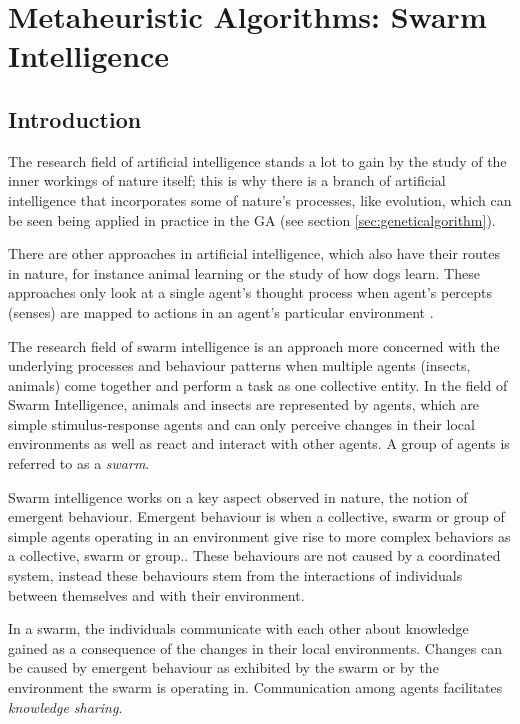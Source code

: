 \chapter[Swarm Intelligence]{Metaheuristic Algorithms: Swarm Intelligence}
\label{chpt:swarm}
\section{Introduction}
The research field of artificial intelligence stands a lot to gain by the study of the inner workings of nature itself; this is why there is a branch of artificial intelligence that incorporates some of nature's processes, like evolution, which can be seen being applied in practice in the \gls{GA} (see section \ref{sec:geneticalgorithm}).

 There are other approaches in artificial intelligence, which also have their routes in nature, for instance animal learning or the study of how dogs learn\cite{DLearning}. These approaches only look at a single agent's thought process when agent's percepts (senses) are mapped to actions in an agent's particular environment \cite{DLearning}. 
 

The research field of swarm intelligence is an approach more concerned with the underlying processes and behaviour patterns when multiple agents (insects, animals) come together and perform a task as one collective entity\cite{DLearning,AIModernApproach}. In the field of Swarm Intelligence, animals and insects are represented by agents, which are simple stimulus-response agents and can only perceive changes in their local environments as well as react and interact with other agents. A group of agents is referred to as a \emph{swarm}.

Swarm intelligence works on a key aspect observed in nature, the notion of emergent behaviour\cite{SwarmArt,FundamentalSwarm}. Emergent behaviour is when a collective, swarm or group of simple agents operating in an environment give rise to more complex behaviors as a collective, swarm or group.\cite{SwarmArt,FundamentalSwarm}. These behaviours are not caused by a coordinated system, instead these behaviours stem from the interactions of individuals between themselves and with their environment\cite{FundamentalSwarm}.

In a swarm, the individuals communicate with each other about knowledge gained as a consequence of the changes in their local environments\cite{SwarmArt,ChaoticSwarmIntel}. Changes can be caused by emergent behaviour as exhibited by the swarm or by the environment the swarm is operating in\cite{CompuIntelligenceIntro,FundamentalSwarm}. Communication among agents facilitates \emph{knowledge sharing}\cite{SwarmArt,FundamentalSwarm}. 

